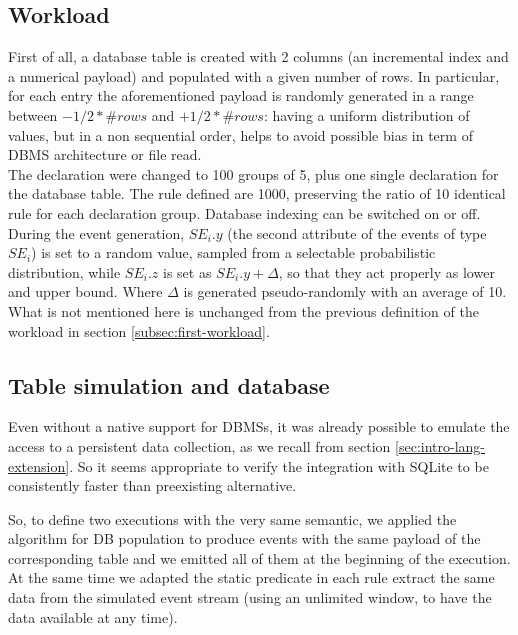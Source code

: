\subsection{Workload}
\label{sec:second-workload}
First of all, a database table is created with 2 columns (an incremental index and a numerical payload) and populated with a given number of rows. In particular, for each entry the aforementioned payload is randomly generated in a range between $-1 / 2 * \#rows$ and $+1 / 2 * \#rows$: having a uniform distribution of values, but in a non sequential order, helps to avoid possible bias in term of DBMS architecture or file read.\\
The declaration were changed to 100 groups of 5, plus one single declaration for the database table. The rule defined are 1000, preserving the ratio of 10 identical rule for each declaration group. Database indexing can be switched on or off.\\
During the event generation, $SE_i.y$ (the second attribute of the events of type $SE_i$) is set to a random value, sampled from a selectable probabilistic distribution, while $SE_i.z$ is set as $SE_i.y + \Delta$, so that they act properly as lower and upper bound. Where $\Delta$ is generated pseudo-randomly with an average of 10.\\
What is not mentioned here is unchanged from the previous definition of the workload in section \ref{subsec:first-workload}.

\subsection{Table simulation and database}
Even without a native support for DBMSs, it was already possible to emulate the access to a persistent data collection, as we recall from section \ref{sec:intro-lang-extension}. So it seems appropriate to verify the integration with SQLite to be consistently faster than preexisting alternative.

So, to define two executions with the very same semantic, we applied the algorithm for DB population to produce events with the same payload of the corresponding table and we emitted all of them at the beginning of the execution. At the same time we adapted the static predicate in each rule extract the same data from the simulated event stream (using an unlimited window, to have the data available at any time).

